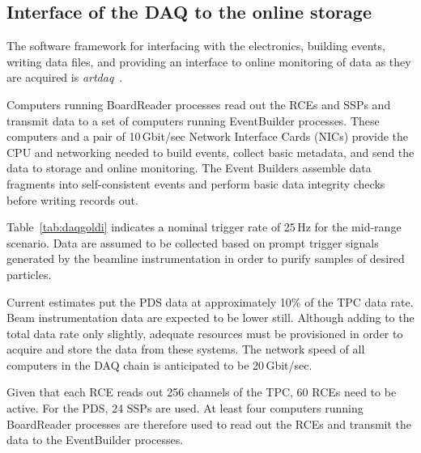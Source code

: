 \subsection{Interface of the DAQ to the online storage}
\label{sec:DAQ_online_interface}

The software framework for
interfacing with the electronics, building events, writing data files,
and providing an interface to online monitoring of data as they are
acquired is \textit{artdaq}~\cite{artdaq}. 

Computers running BoardReader processes read out
the RCEs and SSPs and transmit data to a set of computers running EventBuilder processes.
These computers and a
pair of 10\,Gbit/sec Network Interface Cards (NICs) provide the CPU and networking needed to
build events, collect basic metadata, and send the data to storage and
online monitoring.  The Event Builders assemble data fragments into self-consistent events and perform basic data integrity checks before writing records out.


Table~\ref{tab:daqgoldi} indicates a nominal trigger rate of 25\,Hz for
the mid-range scenario. 
 Data are assumed to be
collected based on prompt trigger signals generated by the beamline
instrumentation in order to purify samples of desired particles.

Current estimates put the PDS data at approximately 10\% 
of the TPC data rate.  Beam instrumentation data are expected to be lower still.
Although adding to the
total data rate only slightly, adequate resources must
be provisioned in order to acquire and store the data from these
systems.  
The network speed of all computers in the DAQ
chain is anticipated to be 20\,Gbit/sec. 


Given that each RCE reads out 256 channels of the TPC, 60 RCEs
need to be active.  For the PDS, 24 SSPs are used.  At least four computers 
running BoardReader processes are therefore used to read out
the RCEs and transmit the data to the EventBuilder processes.


